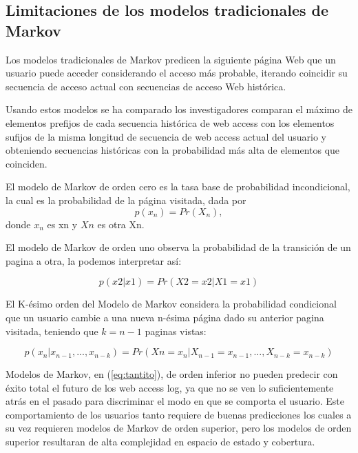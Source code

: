  
 
 \subsection{Limitaciones de los modelos tradicionales de Markov}
 
 
 Los modelos tradicionales de Markov predicen la siguiente página Web que un usuario puede acceder considerando el acceso más probable, iterando coincidir su secuencia de acceso actual con secuencias de acceso Web histórica.
 
 
 Usando estos modelos se ha comparado los investigadores comparan el máximo de elementos  prefijos de cada secuencia histórica de web access con los elementos sufijos de la  misma longitud de secuencia de web access actual del usuario y obteniendo secuencias históricas con la probabilidad más alta de elementos que coinciden.
 
 El modelo de Markov de orden cero es la tasa base de probabilidad incondicional, la cual es la probabilidad de la página visitada, dada por
 \begin{equation}
p(x_n) = Pr(X_n),
 \end{equation}	
 donde $x_{n}$ es xn y $Xn$ es otra Xn.
 
 El modelo de Markov de orden uno observa la probabilidad de la transición de un pagina a otra, la podemos interpretar así:
 
 \begin{equation} 
	 p(x2 | x1) = Pr(X2 = x2 | X1 = x1) 
 \end{equation}	
 
 El K-ésimo orden del Modelo de Markov considera la probabilidad condicional que un usuario cambie a una nueva  n-ésima página  dado su anterior pagina visitada, teniendo que $k = n -1$ paginas vistas:
 
 \begin{equation}\label{eq:tantito}
p( x_{n} | x_{n-1},..., x_{n-k} ) = Pr(X{n} = x_{n} | X_{n-1} = x_{n-1},..., X_{n-k} = x_{n-k}) 
 \end{equation}


 
 
 
 Modelos de Markov, en (\ref{eq:tantito}), de orden inferior no pueden predecir con éxito total el futuro de los web access log, ya que no se ven lo suficientemente atrás en el pasado para discriminar el modo en que se comporta el usuario. Este comportamiento de los usuarios tanto requiere de buenas predicciones los cuales a su vez requieren modelos de Markov de orden superior, pero los modelos de orden superior resultaran de alta complejidad en espacio de estado y cobertura.
 
